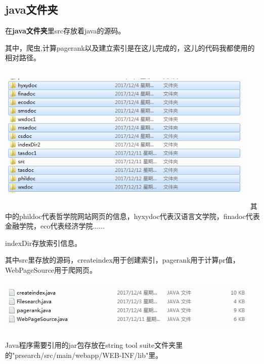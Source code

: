 ﻿\documentclass[UTF8]{ctexart}
\begin{document}
\begin{flushleft}
\subsection{java文件夹}
    在\textbf{java文件夹}里src存放着java的源码。
\par{}
    其中，爬虫,计算pagerank以及建立索引是在这儿完成的，这儿的代码我都使用的相对路径。
\includegraphics[width=5.00in,height=3.00in]{figure22.jpg}
    其中的phildoc代表哲学院网站网页的信息，hyxydoc代表汉语言文学院，finadoc代表金融学院，eco代表经济学院......
\par{}
    indexDir存放索引信息。
\par{}
    其中src里存放的源码，createindex用于创建索引，pagerank用于计算pr值，WebPageSource用于爬网页。
\par{}
\includegraphics[width=5.00in,height=1.00in]{figure23.jpg}
\par{}
    Java程序需要引用的jar包存放在string tool suite文件夹里的"prsearch/src/main/webapp/WEB-INF/lib"里。
\par{}

\end{flushleft}
\end{document}
